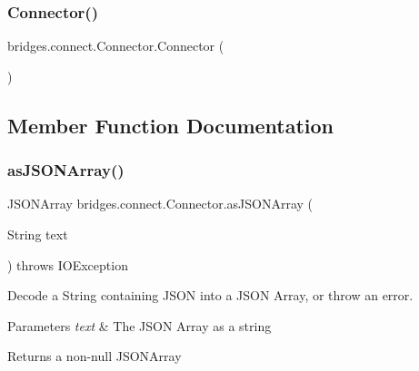 \subsubsection{\texorpdfstring{Connector()}{Connector()}}
{\footnotesize\ttfamily bridges.\+connect.\+Connector.\+Connector (\begin{DoxyParamCaption}{ }\end{DoxyParamCaption})\hspace{0.3cm}{\ttfamily [protected]}}



\subsection{Member Function Documentation}
\mbox{\label{classbridges_1_1connect_1_1_connector_aa5bd647713545fa24c6d730eacb6bc54}} 
\subsubsection{\texorpdfstring{as\+J\+S\+O\+N\+Array()}{asJSONArray()}}
{\footnotesize\ttfamily J\+S\+O\+N\+Array bridges.\+connect.\+Connector.\+as\+J\+S\+O\+N\+Array (\begin{DoxyParamCaption}\item[{String}]{text }\end{DoxyParamCaption}) throws I\+O\+Exception}

Decode a String containing J\+S\+ON into a J\+S\+ON Array, or throw an error. 
\begin{DoxyParams}{Parameters}
{\em text} & The J\+S\+ON Array as a string \\
\hline
\end{DoxyParams}
\begin{DoxyReturn}{Returns}
a non-\/null J\+S\+O\+N\+Array 
\end{DoxyReturn}
\mbox{\label{classbridges_1_1connect_1_1_connector_aac3fb75dd7975c4439cfd1bf6cefe0a6}} 
